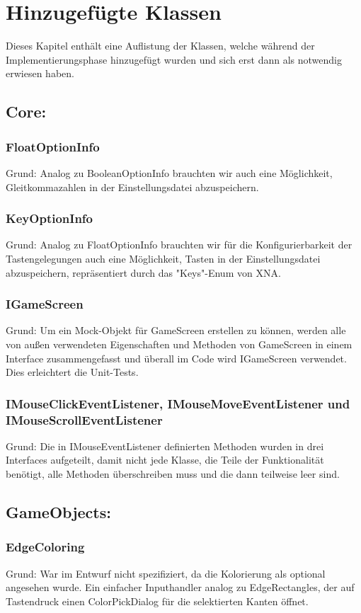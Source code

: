 \chapter{Hinzugefügte Klassen}
Dieses Kapitel enthält eine Auflistung der Klassen, welche während der Implementierungsphase hinzugefügt wurden und sich erst dann als notwendig erwiesen haben.

\section{Core:}
\subsection{FloatOptionInfo}
Grund: Analog zu BooleanOptionInfo brauchten wir auch eine Möglichkeit, Gleitkommazahlen in der Einstellungsdatei abzuspeichern.
\subsection{KeyOptionInfo}
Grund: Analog zu FloatOptionInfo brauchten wir für die Konfigurierbarkeit der Tastengelegungen auch eine Möglichkeit, Tasten in der Einstellungsdatei abzuspeichern, repräsentiert durch das "Keys"-Enum von XNA.
\subsection{IGameScreen}
Grund: Um ein Mock-Objekt für GameScreen erstellen zu können, werden alle von außen verwendeten Eigenschaften und Methoden von GameScreen in einem Interface zusammengefasst und überall im Code wird IGameScreen verwendet. Dies erleichtert die Unit-Tests.
\subsection{IMouseClickEventListener, IMouseMoveEventListener und IMouseScrollEventListener}
Grund: Die in IMouseEventListener definierten Methoden wurden in drei Interfaces aufgeteilt, damit nicht jede Klasse,
die Teile der Funktionalität benötigt, alle Methoden überschreiben muss und die dann teilweise leer sind.

\section{GameObjects:}
\subsection{EdgeColoring}
Grund: War im Entwurf nicht spezifiziert, da die Kolorierung als optional angesehen wurde. Ein einfacher Inputhandler analog zu EdgeRectangles, der auf Tastendruck einen ColorPickDialog für die selektierten Kanten öffnet.
